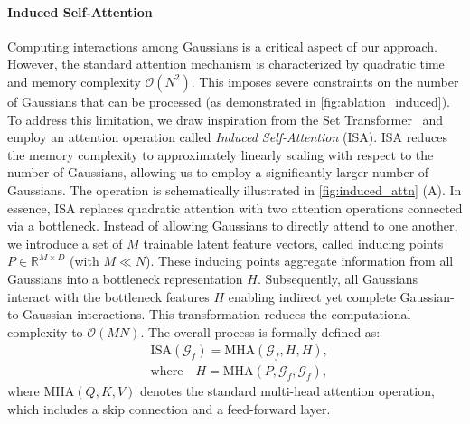 \documentclass[10pt,twocolumn,letterpaper]{article}
\begin{document}
\paragraph{Induced Self-Attention}
Computing interactions among Gaussians is a critical aspect of our approach.
However, the standard attention mechanism is characterized by quadratic time and memory complexity $\mathcal{O}(N^2)$.
This imposes severe constraints on the number of Gaussians that can be processed (as demonstrated in \cref{fig:ablation_induced}).
To address this limitation, we draw inspiration from the Set Transformer~\cite{lee2019set} and employ an attention operation called \emph{Induced Self-Attention} (ISA).
ISA reduces the memory complexity to approximately linearly scaling with respect to the number of Gaussians, allowing us to employ a significantly larger number of Gaussians. 
The operation is schematically illustrated in \cref{fig:induced_attn} (A).
In essence, ISA replaces quadratic attention with two attention operations connected via a bottleneck.
Instead of allowing Gaussians to directly attend to one another, we introduce a set of $M$ trainable latent feature vectors, called inducing points $P \in \mathbb{R}^{M \times D}$ (with $M \ll N$).
These inducing points aggregate information from all Gaussians into a bottleneck representation $H$.
Subsequently, all Gaussians interact with the bottleneck features $H$ enabling indirect yet complete Gaussian-to-Gaussian interactions.
This transformation reduces the computational complexity to $\mathcal{O}(MN)$. 
The overall process is formally defined as:
\begin{align}
    &\ \mathrm{ISA}(\mathcal{G}_f) = \mathrm{MHA}(\mathcal{G}_f, H, H), \; \\
    &\ \text{where} \quad H = \mathrm{MHA}(P, \mathcal{G}_f, \mathcal{G}_f),
    \label{eq:induced_self}
\end{align}
where $\mathrm{MHA}(Q, K, V)$ denotes the standard multi-head attention operation, which includes a skip connection and a feed-forward layer.
\end{document}
